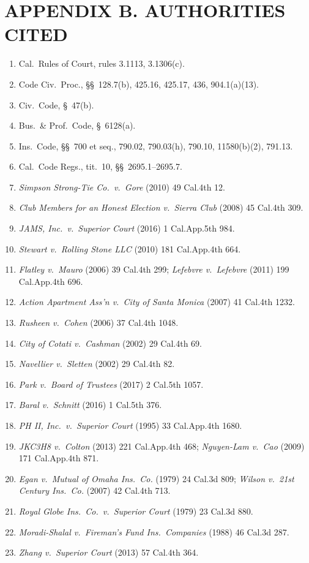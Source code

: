 \section*{APPENDIX B. AUTHORITIES CITED}

\begin{enumerate}
\tightlist
\item Cal.\ Rules of Court, rules 3.1113, 3.1306(c).
\item Code Civ.\ Proc., \S\S~128.7(b), 425.16, 425.17, 436, 904.1(a)(13).
\item Civ.\ Code, \S~47(b).
\item Bus.\ \& Prof.\ Code, \S~6128(a).
\item Ins.\ Code, \S\S~700 et seq., 790.02, 790.03(h), 790.10, 11580(b)(2), 791.13.
\item Cal.\ Code Regs., tit.\ 10, \S\S~2695.1--2695.7.
\item \textit{Simpson Strong-Tie Co.\ v.\ Gore} (2010) 49 Cal.4th 12.
\item \textit{Club Members for an Honest Election v.\ Sierra Club} (2008) 45 Cal.4th 309.
\item \textit{JAMS, Inc.\ v.\ Superior Court} (2016) 1 Cal.App.5th 984.
\item \textit{Stewart v.\ Rolling Stone LLC} (2010) 181 Cal.App.4th 664.
\item \textit{Flatley v.\ Mauro} (2006) 39 Cal.4th 299; \textit{Lefebvre v.\ Lefebvre} (2011) 199 Cal.App.4th 696.
\item \textit{Action Apartment Ass'n v.\ City of Santa Monica} (2007) 41 Cal.4th 1232.
\item \textit{Rusheen v.\ Cohen} (2006) 37 Cal.4th 1048.
\item \textit{City of Cotati v.\ Cashman} (2002) 29 Cal.4th 69.
\item \textit{Navellier v.\ Sletten} (2002) 29 Cal.4th 82.
\item \textit{Park v.\ Board of Trustees} (2017) 2 Cal.5th 1057.
\item \textit{Baral v.\ Schnitt} (2016) 1 Cal.5th 376.
\item \textit{PH II, Inc.\ v.\ Superior Court} (1995) 33 Cal.App.4th 1680.
\item \textit{JKC3H8 v.\ Colton} (2013) 221 Cal.App.4th 468; \textit{Nguyen-Lam v.\ Cao} (2009) 171 Cal.App.4th 871.
\item \textit{Egan v.\ Mutual of Omaha Ins.\ Co.} (1979) 24 Cal.3d 809; \textit{Wilson v.\ 21st Century Ins.\ Co.} (2007) 42 Cal.4th 713.
\item \textit{Royal Globe Ins.\ Co.\ v.\ Superior Court} (1979) 23 Cal.3d 880.
\item \textit{Moradi-Shalal v.\ Fireman's Fund Ins.\ Companies} (1988) 46 Cal.3d 287.
\item \textit{Zhang v.\ Superior Court} (2013) 57 Cal.4th 364.
\end{enumerate}



